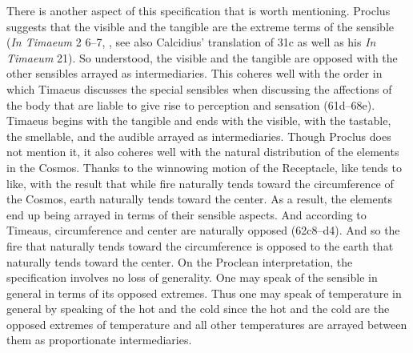 There is another aspect of this specification that is worth mentioning. Proclus suggests that the visible and the tangible are the extreme terms of the sensible (\emph{In Timaeum} 2 6--7, \citealt{Diehl:1903re}, see also Calcidius' translation of 31c as well as his \emph{In Timaeum} 21). So understood, the visible and the tangible are opposed with the other sensibles arrayed as intermediaries. This coheres well with the order in which Timaeus discusses the special sensibles when discussing the affections of the body that are liable to give rise to perception and sensation (61d--68e). Timaeus begins with the tangible and ends with the visible, with the tastable, the smellable, and the audible arrayed as intermediaries. Though Proclus does not mention it, it also coheres well with the natural distribution of the elements in the Cosmos. Thanks to the winnowing motion of the Receptacle, like tends to like, with the result that while fire naturally tends toward the circumference of the Cosmos, earth naturally tends toward the center. As a result, the elements end up being arrayed in terms of their sensible aspects. And according to Timeaus, circumference and center are naturally opposed (62c8–d4). And so the fire that naturally tends toward the circumference is opposed to the earth that naturally tends toward the center. On the Proclean interpretation, the specification involves no loss of generality. One may speak of the sensible in general in terms of its opposed extremes. Thus one may speak of temperature in general by speaking of the hot and the cold since the hot and the cold are the opposed extremes of temperature and all other temperatures are arrayed between them as proportionate intermediaries.

